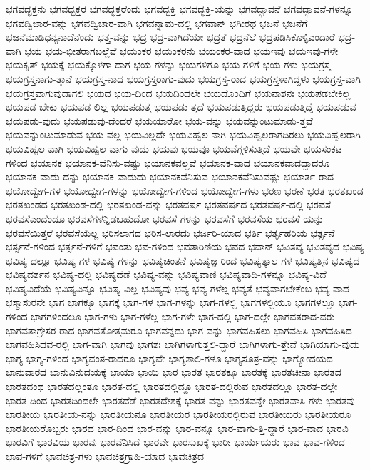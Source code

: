 {ಭಗವದ್ಭಕ್ತನು
ಭಗವದ್ಭಕ್ತರ
ಭಗವದ್ಭಕ್ತರೆಂದು
ಭಗವದ್ಭಕ್ತಿ
ಭಗವದ್ಭಕ್ತಿ-ಯನ್ನು
ಭಗವದ್ಭಾವನೆ
ಭಗವದ್ಭಾವನೆ-ಗಳನ್ನೂ
ಭಗವದ್ವಿಚಾರ-ವನ್ನು
ಭಗವದ್ವಿಚಾರ-ವಾಗಿ
ಭಗವನ್ನಾಮ-ದಲ್ಲಿ
ಭಗವಾನ್
ಭಗೀರಥ
ಭಜನೆ
ಭಜನೆಗೆ
ಭಜನೆಮಾಡಿಧನ್ಯನಾದೆನೆಂದು
ಭತ್ತ-ವನ್ನು
ಭದ್ರ
ಭದ್ರ-ವಾಗಿದೆಯೇ
ಭದ್ರತೆ
ಭದ್ರನೆಲೆ
ಭದ್ರಪಡಿಸಿಕೊಳ್ಳಿಎಂದಾರೆ
ಭದ್ರ-ವಾಗಿ
ಭಯ
ಭಯ-ಭೀತರಾಗಬಲ್ಲೆವೆ
ಭಯಂಕರ
ಭಯಂಕರನು
ಭಯಂಕರ-ವಾದ
ಭಯಇವು
ಭಯಇವು-ಗಳೇ
ಭಯಕೃತ್
ಭಯಕ್ಕೆ
ಭಯಕ್ಕೊಳಗಾ-ದಾಗ
ಭಯ-ಗಳನ್ನು
ಭಯಗಳಿಗೂ
ಭಯ-ಗಳಿಗೆ
ಭಯ-ಗಳು
ಭಯಗ್ರಸ್ತ
ಭಯಗ್ರಸ್ತನಾಗು-ತ್ತಾನೆ
ಭಯಗ್ರಸ್ತ-ನಾದ
ಭಯಗ್ರಸ್ತರಾಗು-ವುದು
ಭಯಗ್ರಸ್ತ-ರಾದ
ಭಯಗ್ರಸ್ತಳಾಗಿದ್ದಳು
ಭಯಗ್ರಸ್ತ-ವಾಗಿ
ಭಯಗ್ರಸ್ತವಾಗುವುದಾಗಲಿ
ಭಯದ
ಭಯ-ದಿಂದ
ಭಯದಿಂದಲೇ
ಭಯದೊಂದಿಗೆ
ಭಯನಾಶನಃ
ಭಯಪಡಬೇಕಿಲ್ಲ
ಭಯಪಡ-ಬೇಕು
ಭಯಪಡ-ಲಿಲ್ಲ
ಭಯಪಡುತ್ತ
ಭಯಪಡು-ತ್ತದೆ
ಭಯಪಡುತ್ತಿದ್ದರು
ಭಯಪಡುತ್ತಿದ್ದೆ
ಭಯಪಡುವ
ಭಯಪಡು-ವುದು
ಭಯಪಡುವು-ದೆಂದರೆ
ಭಯಯಾರೋ
ಭಯ-ವನ್ನು
ಭಯವನ್ನುಂಟುಮಾಡು-ತ್ತವೆ
ಭಯವನ್ನುಂಟುಮಾಡುವ
ಭಯ-ವಲ್ಲ
ಭಯವಿಲ್ಲದೇ
ಭಯವಿಹ್ವಲ-ನಾಗಿ
ಭಯವಿಹ್ವಲರಾಗದಿರಲು
ಭಯವಿಹ್ವಲರಾಗಿ
ಭಯವಿಹ್ವಲ-ವಾಗಿ
ಭಯವಿಹ್ವಲ-ವಾಗು-ವುದು
ಭಯವು
ಭಯವೂ
ಭಯವೆಗ್ಗಳಿಸುತ್ತಿದೆ
ಭಯವೇ
ಭಯಸಂಕಟ-ಗಳಿಂದ
ಭಯಾನಕ
ಭಯಾನಕ-ವೆನಿಸು-ವಷ್ಟು
ಭಯಾನಕವಲ್ಲವೆ
ಭಯಾನಕ-ವಾದ
ಭಯಾನಕವಾದದ್ದಾದರೂ
ಭಯಾನಕ-ವಾದು-ದನ್ನು
ಭಯಾನಕ-ವಾದುದು
ಭಯಾನಕವೆನಿಸುವ
ಭಯಾನಕವೆನಿಸುವಷ್ಟು
ಭಯಾರ್ತ-ರಾದ
ಭಯೋದ್ವೇಗ-ಗಳ
ಭಯೋದ್ವೇಗ-ಗಳನ್ನು
ಭಯೋದ್ವೇಗ-ಗಳಿಂದ
ಭಯೋದ್ವೇಗ-ಗಳು
ಭರಣ
ಭರಣೆ
ಭರತ
ಭರತಖಂಡ
ಭರತಖಂಡದ
ಭರತಖಂಡ-ದಲ್ಲಿ
ಭರತಖಂಡ-ವನ್ನು
ಭರತವರ್ಷ
ಭರತವರ್ಷದ
ಭರತವರ್ಷ-ದಲ್ಲಿ
ಭರವಸೆ
ಭರವಸೆಎಂದೆಂದೂ
ಭರವಸೆಗಳನ್ನಿಡಬಹುದೋ
ಭರವಸೆ-ಗಳನ್ನು
ಭರವಸೆಗೆ
ಭರವಸೆಯ
ಭರವಸೆ-ಯನ್ನು
ಭರವಸೆಯಿತ್ತರೆ
ಭರವಸೆಯೆಲ್ಲ
ಭರಿಸಲಾಗದ
ಭರಿಸ-ಲಾರದು
ಭರ್ಜರಿ-ಯಾದ
ಭರ್ತಿ
ಭರ್ತೃಹರಿಯ
ಭರ್ತ್ಸನೆ
ಭರ್ತ್ಸನೆ-ಗಳಿಂದ
ಭರ್ತ್ಸನೆ-ಗಳಿಗೆ
ಭವಂತು
ಭವ-ಗಳಿಂದ
ಭವತಾರಿಣಿಯ
ಭವದ
ಭವಾನ್
ಭವಿತವ್ಯ
ಭವಿತವ್ಯದ
ಭವಿಷ್ಯ
ಭವಿಷ್ಯ-ದಲ್ಲೂ
ಭವಿಷ್ಯ-ಗಳ
ಭವಿಷ್ಯ-ಗಳನ್ನು
ಭವಿಷ್ಯಚಿಂತನೆ
ಭವಿಷ್ಯಜ್ಞ-ರಿಂದ
ಭವಿಷ್ಯತ್ಕಾಲ-ಗಳ
ಭವಿಷ್ಯತ್ತಿನ
ಭವಿಷ್ಯದ
ಭವಿಷ್ಯದರ್ಶನ
ಭವಿಷ್ಯ-ದಲ್ಲಿ
ಭವಿಷ್ಯದೆಡೆ
ಭವಿಷ್ಯ-ವನ್ನು
ಭವಿಷ್ಯವಾಣಿ
ಭವಿಷ್ಯವಾದಿ-ಗಳನ್ನೂ
ಭವಿಷ್ಯ-ವಿದೆ
ಭವಿಷ್ಯವಿದೆಯೆ
ಭವಿಷ್ಯವಿನ್ನೂ
ಭವಿಷ್ಯ-ವಿಲ್ಲ
ಭವಿಷ್ಯವು
ಭವ್ಯ
ಭವ್ಯ-ಗಳೆಲ್ಲ
ಭವ್ಯತೆ
ಭವ್ಯವಾಗಬೇಕೆಂಬ
ಭವ್ಯ-ವಾದ
ಭಸ್ಮಾಸುರನೇ
ಭಾಗ
ಭಾಗಕ್ಕೂ
ಭಾಗಕ್ಕೆ
ಭಾಗ-ಗಳ
ಭಾಗ-ಗಳನ್ನು
ಭಾಗ-ಗಳಲ್ಲಿ
ಭಾಗಗಳಲ್ಲಿಯೂ
ಭಾಗಗಳಲ್ಲೂ
ಭಾಗ-ಗಳಿಂದ
ಭಾಗಗಳಿಂದಲೂ
ಭಾಗ-ಗಳು
ಭಾಗ-ಗಳೆಲ್ಲ
ಭಾಗ-ಗಳೇ
ಭಾಗ-ದಲ್ಲಿ
ಭಾಗ-ದಲ್ಲೇ
ಭಾಗವತರಾದ-ವರು
ಭಾಗವತಾಗ್ರೇಸರ-ರಾದ
ಭಾಗವತೋತ್ತಮರೂ
ಭಾಗವನ್ನದು
ಭಾಗ-ವನ್ನು
ಭಾಗವಹಿಸಲು
ಭಾಗವಹಿಸಿ
ಭಾಗವಹಿಸಿದ
ಭಾಗವಹಿಸಿದವ-ರಲ್ಲಿ
ಭಾಗ-ವಾಗಿ
ಭಾಗವು
ಭಾಗಶಃ
ಭಾಗಿಗಳಾಗುತ್ತಲಿ-ದ್ದಾರೆ
ಭಾಗಿಗಳಾಗು-ತ್ತೇವೆ
ಭಾಗಿಯಾಗು-ವುದು
ಭಾಗ್ಯ
ಭಾಗ್ಯ-ಗಳಿಂದ
ಭಾಗ್ಯವಂತ-ರಾದರೂ
ಭಾಗ್ಯವೇ
ಭಾಗ್ಯಶಾಲಿ-ಗಳೂ
ಭಾಗ್ಯಸೂತ್ರ-ವನ್ನು
ಭಾಗ್ಯೋದಯದ
ಭಾನುವಾರದ
ಭಾನುವಿನುದಯಕ್ಕೆ
ಭಾಯಾ
ಭಾಯಿ
ಭಾರ
ಭಾರತ
ಭಾರತಕ್ಕೂ
ಭಾರತಕ್ಕೆ
ಭಾರತಚೀನಾ
ಭಾರತದ
ಭಾರತದಂಥ
ಭಾರತದಲ್ಲಂತೂ
ಭಾರತ-ದಲ್ಲಿ
ಭಾರತದಲ್ಲಿದ್ದೂ
ಭಾರತ-ದಲ್ಲಿರುವ
ಭಾರತದಲ್ಲೂ
ಭಾರತ-ದಲ್ಲೇ
ಭಾರತ-ದಿಂದ
ಭಾರತದಿಂದಲೇ
ಭಾರತದೆಡೆ
ಭಾರತದೇಶಕ್ಕೆ
ಭಾರತ-ವನ್ನು
ಭಾರತವನ್ನೇ
ಭಾರತವಾಸಿ-ಗಳು
ಭಾರತವು
ಭಾರತೀಯ
ಭಾರತೀಯ-ನನ್ನು
ಭಾರತೀಯನೂ
ಭಾರತೀಯರ
ಭಾರತೀಯರಲ್ಲಿರುವ
ಭಾರತೀಯರು
ಭಾರತೀಯರೂ
ಭಾರತೀಯರೊಬ್ಬರು
ಭಾರದ
ಭಾರ-ದಿಂದ
ಭಾರ-ವನ್ನು
ಭಾರ-ವನ್ನೂ
ಭಾರ-ವಾಗು-ತ್ತಿ-ದ್ದಾರೆ
ಭಾರ-ವಾದ
ಭಾರವಿ
ಭಾರವಿಗೆ
ಭಾರವಿಯ
ಭಾರವು
ಭಾರವೆನಿಸಿದೆ
ಭಾರವೇ
ಭಾರಸುಖಕ್ಕೆ
ಭಾರೀ
ಭಾರ್ಯೆಯರು
ಭಾವ
ಭಾವ-ಗಳಿಂದ
ಭಾವ-ಗಳಿಗೆ
ಭಾವಚಿತ್ರ-ಗಳು
ಭಾವಚಿತ್ರಗ್ರಾಹಿ-ಯಾದ
ಭಾವಚಿತ್ರದ
}
